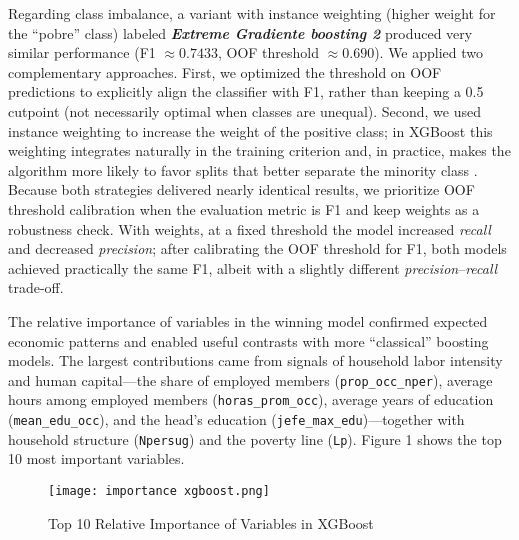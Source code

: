 \documentclass[12pt,a4paper,onecolumn]{article}
\begin{document}
Regarding class imbalance, a variant with instance weighting (higher weight for the ``pobre'' class) labeled \textbf{\textit{Extreme Gradiente boosting 2}} produced very similar performance (F1 $\approx 0.7433$, OOF threshold $\approx 0.690$). We applied two complementary approaches. First, we optimized the threshold on OOF predictions to explicitly align the classifier with F1, rather than keeping a 0.5 cutpoint (not necessarily optimal when classes are unequal). Second, we used instance weighting to increase the weight of the positive class; in XGBoost this weighting integrates naturally in the training criterion and, in practice, makes the algorithm more likely to favor splits that better separate the minority class \citep{ChenGuestrin2016}. Because both strategies delivered nearly identical results, we prioritize OOF threshold calibration when the evaluation metric is F1 and keep weights as a robustness check. With weights, at a fixed threshold the model increased \textit{recall} and decreased \textit{precision}; after calibrating the OOF threshold for F1, both models achieved practically the same F1, albeit with a slightly different \textit{precision}--\textit{recall} trade-off.



The relative importance of variables in the winning model confirmed expected economic patterns and enabled useful contrasts with more ``classical'' boosting models. The largest contributions came from signals of household labor intensity and human capital---the share of employed members (\texttt{prop\_occ\_nper}), average hours among employed members (\texttt{horas\_prom\_occ}), average years of education (\texttt{mean\_edu\_occ}), and the head’s education (\texttt{jefe\_max\_edu})---together with household structure (\texttt{Npersug}) and the poverty line (\texttt{Lp}). Figure 1 shows the top 10 most important variables.


\begin{figure}
    \centering
    \texttt{[image: importance xgboost.png]}
    \caption{Top 10 Relative Importance of Variables in XGBoost}
    \label{fig:placeholder}
\end{figure}
\end{document}

